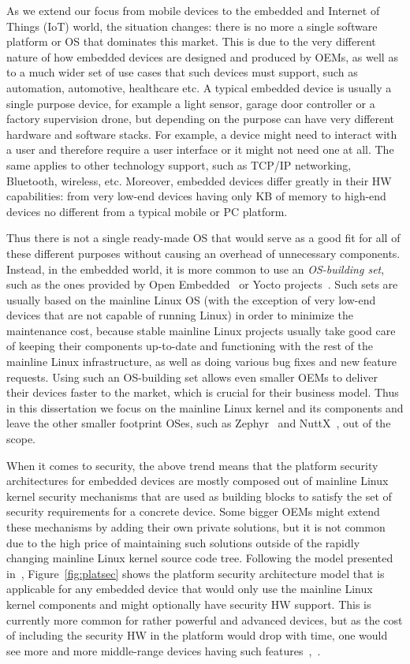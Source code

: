 As we extend our focus from mobile devices to the embedded and Internet of Things (IoT) world, the situation changes: there is no more a single software platform or OS that dominates this market. This is due to the very different nature of how embedded devices are designed and produced by OEMs, as well as to a much wider set of use cases that such devices must support, such as automation, automotive, healthcare etc. A typical embedded device is usually a single purpose device, for example a light sensor, garage door controller or a factory supervision drone, but depending on the purpose can have very different hardware and software stacks. For example, a device might need to interact with a user and therefore require a user interface or it might not need one at all. The same applies to other technology support, such as TCP/IP networking, Bluetooth, wireless, etc. Moreover, embedded devices differ greatly in their HW capabilities: from very low-end devices having only KB of memory to high-end devices no different from a typical mobile or PC platform.

Thus there is not a single ready-made OS that would serve as a good fit for all of these different purposes without causing an overhead of unnecessary components. Instead, in the embedded world, it is more common to use an \textit{OS-building set}, such as the ones provided by Open Embedded~\cite{OE2017} or Yocto projects~\cite{yocto2017}. Such sets are usually based on the mainline Linux OS (with the exception of very low-end devices that are not capable of running Linux) in order to minimize the maintenance cost, because stable mainline Linux projects usually take good care of keeping their components up-to-date and functioning with the rest of the mainline Linux infrastructure, as well as doing various bug fixes and new feature requests. Using such an OS-building set allows even smaller OEMs to deliver their devices faster to the market, which is crucial for their business model. Thus in this dissertation we focus on the mainline Linux kernel and its components and leave the other smaller footprint OSes, such as Zephyr~\cite{zephyr} and NuttX~\cite{NuttX}, out of the scope. 

When it comes to security, the above trend means that the platform security architectures for embedded devices are mostly composed out of mainline Linux kernel security mechanisms that are used as building blocks to satisfy the set of security requirements for a concrete device. Some bigger OEMs might extend these mechanisms by adding their own private solutions, but it is not common due to the high price of maintaining such solutions outside of the rapidly changing mainline Linux kernel source code tree. Following the model presented in~\cite{2013Asokan}, Figure~\ref{fig:platsec} shows the platform security architecture model that is applicable for any embedded device that would only use the mainline Linux kernel components and might optionally have security HW support. This is currently more common for rather powerful and advanced devices, but as the cost of including the security HW in the platform would drop with time, one would see more and more middle-range devices having such features~\cite{marketresearch},~\cite{iothwsecurity}. 


